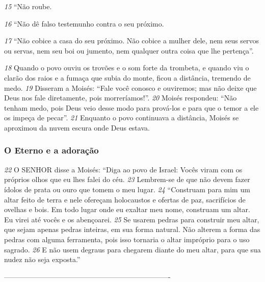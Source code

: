 \medskip
\textit{\tiny 15}
“Não roube.

\medskip
\textit{\tiny 16}
“Não dê falso testemunho contra o seu próximo.

\medskip
\textit{\tiny 17}
“Não cobice a casa do seu próximo. Não cobice a mulher dele, nem seus servos ou servas, nem seu boi ou jumento, nem qualquer outra coisa que lhe pertença”.
  
\bigskip
\textit{\tiny 18}
Quando o povo ouviu os trovões e o som forte da trombeta, e quando viu o
clarão dos raios e a fumaça que subia do monte, ficou a distância, tremendo de medo.
\textit{\tiny 19}
Disseram a Moisés: “Fale você conosco e ouviremos; mas não deixe que Deus
nos fale diretamente, pois morreríamos!”.
\textit{\tiny 20}
Moisés respondeu: “Não tenham medo, pois Deus veio desse modo para
prová-los e para que o temor a ele os impeça de pecar”.
\textit{\tiny 21}
Enquanto o povo continuava a distância, Moisés se aproximou da nuvem
escura onde Deus estava.

\bigskip
\subsubsection*{O Eterno e a adoração}
\textit{\tiny 22}
O SENHOR disse a Moisés: “Diga ao povo de Israel: Vocês viram com os próprios olhos que eu lhes falei do céu. 
\textit{\tiny 23}
Lembrem-se de que não devem fazer ídolos de
prata ou ouro que tomem o meu lugar.
\textit{\tiny 24}
“Construam para mim um altar feito de terra e nele ofereçam holocaustos e
ofertas de paz, sacrifícios de ovelhas e bois. Em todo lugar onde eu exaltar meu nome, construam um altar. Eu virei até vocês e os abençoarei. 
\textit{\tiny 25}
Se usarem pedras
para construir meu altar, que sejam apenas pedras inteiras, em sua forma natural.
Não alterem a forma das pedras com alguma ferramenta, pois isso tornaria o altar impróprio para o uso sagrado. 
\textit{\tiny 26}
E não usem degraus para chegarem diante do
meu altar, para que sua nudez não seja exposta.”

----------------------------------------------------------------------
